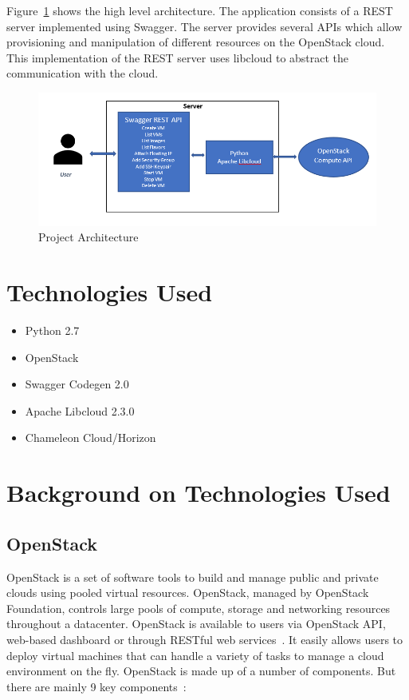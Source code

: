 Figure~\ref{fig:project-architecture} shows the high level architecture. The 
application consists of a REST server implemented using Swagger. The server
provides several APIs which allow provisioning and manipulation of different
resources on the OpenStack cloud. This implementation of the REST server uses 
libcloud to abstract the communication with the cloud. 

\begin{figure}[!ht]
        \centering\includegraphics[width=\columnwidth]
        {images/proj-architecture.PNG}
        \caption{Project Architecture}
        \label{fig:project-architecture}
\end{figure}

\section{Technologies Used}
\begin{itemize}
\item Python 2.7
\item OpenStack 
\item Swagger Codegen 2.0
\item Apache Libcloud 2.3.0
\item Chameleon Cloud/Horizon
\end{itemize}

\section{Background on Technologies Used}

\subsection{OpenStack}
OpenStack is a set of software tools to build and manage public and private
clouds using pooled virtual resources. OpenStack, managed by OpenStack
Foundation, controls large pools of compute, storage and networking resources
throughout a datacenter. OpenStack is available to users via OpenStack API,
web-based dashboard or through RESTful web
services~\cite{hid-sp18-516-www-wiki-openstack}. It easily allows users to
deploy virtual machines that can handle a variety of tasks to manage a cloud
environment on the fly. OpenStack is made up of a number of components. But
there are mainly 9 key components~\cite{hid-sp18-516-www-opensource}:


